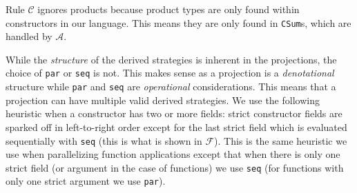 Rule $\mathcal{C}$ ignores products because product types
are only found within constructors in our language. This means they are only found
in \verb-CSum-s, which are handled by $\mathcal{A}$.

While the \emph{structure} of the derived strategies is inherent in the
projections, the choice of \verb-par- or \verb-seq- is not. This makes sense as
a projection is a \emph{denotational} structure while \verb-par- and \verb-seq-
are \emph{operational} considerations. This means that a projection can have
multiple valid derived strategies. We use the following heuristic when a
constructor has two or more fields: strict constructor fields are sparked off
in left-to-right order except for the last strict field which is evaluated
sequentially with \verb-seq- (this is what is shown in $\mathcal{F}$). This is
the same heuristic we use when parallelizing function applications except that
when there is only one strict field (or argument in the case of functions) we
use \verb-seq- (for functions with only one strict argument we use \verb-par-).
